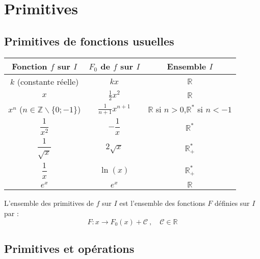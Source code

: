 \documentclass{report}
\newcommand{\R}{\mathbb{R}}
\begin{document}
    \newpage









    \section{Primitives}

      \subsection{Primitives de fonctions usuelles}

      \begin{center}
        \renewcommand{\arraystretch}{2.25}
        \begin{tabular}{|c|c|c|}
          \hline
          \textbf{Fonction $f$ sur $I$} 
          & \textbf{$F_0$ de $f$ sur $I$} 
          & \textbf{Ensemble $I$} \\
          \hline
          $k$ (constante réelle) & $kx$ & $\mathbb{R}$ \\
          \hline
          $x$ & $\frac{1}{2} x^2$ & $\mathbb{R}$ \\
          \hline
          $x^n$ ($n \in \mathbb{Z}\backslash\{0;-1\}$) 
          & $\frac{1}{n+1} x^{n+1}$ 
          & $\mathbb{R}$ si $n > 0$,\newline $\mathbb{R}^*$ si $n < -1$ \\
          \hline
          $\dfrac{1}{x^2}$ & $-\dfrac{1}{x}$ & $\mathbb{R}^*$ \\
          \hline
          $\dfrac{1}{\sqrt{x}}$ & $2 \sqrt{x}$ & $\mathbb{R}^*_+$ \\
          \hline
          $\dfrac{1}{x}$ & $\ln(x)$ & $\mathbb{R}^*_+$ \\
          \hline
          $e^x$ & $e^x$ & $\mathbb{R}$ \\
          \hline
        \end{tabular}
      \end{center}

      L'ensemble des primitives de $f$ sur $I$ est l'ensemble des fonctions $F$ définies sur $I$ par : 
      \[\boxed{F : x \to F_0(x) + \mathcal{C}} ~ , \quad \mathcal{C} \in \R\]

      \iffalse\subsection{Primitives et opérations}
\end{document}
